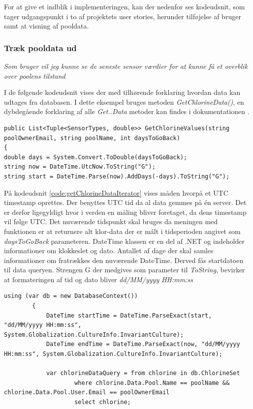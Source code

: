 For at give et indblik i implementeringen, kan der nedenfor ses kodeudsnit, som tager udgangspunkt i to af projektets user stories, herunder tilføjelse af bruger samt at visning af pooldata.

\subsubsection{Træk pooldata ud}

\textit{Som bruger vil jeg kunne se de seneste sensor værdier for at kunne få et overblik over poolens tilstand}\

I de følgende kodeudsnit vises der med tilhørende forklaring hvordan data kan udtages fra databasen. I dette eksempel bruges metoden \textit{GetChlorineData()}, en dybdegående forklaring af alle \textit{Get..Data} metoder kan findes i dokumentationen .

\begin{lstlisting}[caption= GetChlorineData method - konvertering af DateTime objekter, label=code:getChlorineData]
public List<Tuple<SensorTypes, double>> GetChlorineValues(string poolOwnerEmail, string poolName, int daysToGoBack)
{
double days = System.Convert.ToDouble(daysToGoBack);
string now = DateTime.UtcNow.ToString("G");
string start = DateTime.Parse(now).AddDays(-days).ToString("G");
\end{lstlisting}

På kodeudsnit \ref{code:getChlorineDataIterator} vises måden hvorpå et UTC timestamp oprettes. Der benyttes UTC tid da al data gemmes på én server. Det er derfor ligegyldigt hvor i verden en måling bliver foretaget, da dens timestamp vil følge UTC. Det nuværende tidspunkt skal bruges da meningen med funktionen er at returnere alt klor-data der er målt i tidsperioden angivet som \textit{daysToGoBack} parameteren. DateTime \cite{dotnetdatetime} klassen er en del af .NET og indeholder informationer om klokkeslet og dato. Antallet af dage der skal samles informationer om fratrækkes den nuværende DateTime. Derved fås startdatoen til data queryen. Strengen G der medgives som parameter til \textit{ToString}, bevirker at formateringen af tid og dato bliver \textit{dd/MM/yyyy HH:mm:ss}

\begin{lstlisting}[caption=Konvertering tilbage til DateTime objekter,label=code:convertToDateTime]
using (var db = new DatabaseContext())
		{   
			DateTime startTime = DateTime.ParseExact(start, "dd/MM/yyyy HH:mm:ss", System.Globalization.CultureInfo.InvariantCulture);
			DateTime endTime = DateTime.ParseExact(now, "dd/MM/yyyy HH:mm:ss", System.Globalization.CultureInfo.InvariantCulture);

			var chlorineDataQuery = from chlorine in db.ChlorineSet
					where chlorine.Data.Pool.Name == poolName && chlorine.Data.Pool.User.Email == poolOwnerEmail
					select chlorine;

\end{lstlisting}

